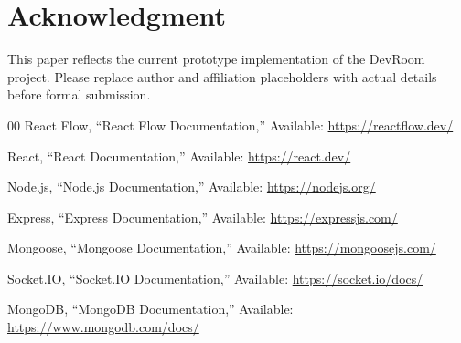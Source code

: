 \documentclass[conference]{IEEEtran}
\begin{document}
\section*{Acknowledgment}
This paper reflects the current prototype implementation of the DevRoom project. Please replace author and affiliation placeholders with actual details before formal submission.

\begin{thebibliography}{00}
React Flow, ``React Flow Documentation,'' Available: \url{https://reactflow.dev/}

React, ``React Documentation,'' Available: \url{https://react.dev/}

Node.js, ``Node.js Documentation,'' Available: \url{https://nodejs.org/}

Express, ``Express Documentation,'' Available: \url{https://expressjs.com/}

Mongoose, ``Mongoose Documentation,'' Available: \url{https://mongoosejs.com/}

Socket.IO, ``Socket.IO Documentation,'' Available: \url{https://socket.io/docs/}

MongoDB, ``MongoDB Documentation,'' Available: \url{https://www.mongodb.com/docs/}
\end{thebibliography}
%
\end{document}
